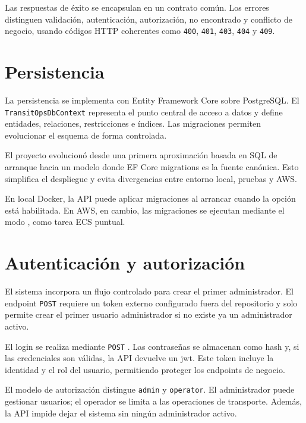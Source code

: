 Las respuestas de éxito se encapsulan en un contrato común. Los errores distinguen validación, autenticación, autorización, no encontrado y conflicto de negocio, usando códigos HTTP coherentes como \texttt{400}, \texttt{401}, \texttt{403}, \texttt{404} y \texttt{409}.

\section{Persistencia}
\label{sec:persistencia}

La persistencia se implementa con Entity Framework Core sobre PostgreSQL. El \texttt{TransitOpsDbContext} representa el punto central de acceso a datos y define entidades, relaciones, restricciones e índices. Las migraciones permiten evolucionar el esquema de forma controlada.

El proyecto evolucionó desde una primera aproximación basada en SQL de arranque hacia un modelo donde EF Core migrations es la fuente canónica. Esto simplifica el despliegue y evita divergencias entre entorno local, pruebas y AWS.

En local Docker, la API puede aplicar migraciones al arrancar cuando la opción  está habilitada. En AWS, en cambio, las migraciones se ejecutan mediante el modo , como tarea ECS puntual.

\section{Autenticación y autorización}
\label{sec:autenticacion-autorizacion}

El sistema incorpora un flujo controlado para crear el primer administrador. El endpoint \texttt{POST}  requiere un token externo configurado fuera del repositorio y solo permite crear el primer usuario administrador si no existe ya un administrador activo.

El login se realiza mediante \texttt{POST} . Las contraseñas se almacenan como hash y, si las credenciales son válidas, la API devuelve un \acrshort{jwt}. Este token incluye la identidad y el rol del usuario, permitiendo proteger los endpoints de negocio.

El modelo de autorización distingue \texttt{admin} y \texttt{operator}. El administrador puede gestionar usuarios; el operador se limita a las operaciones de transporte. Además, la API impide dejar el sistema sin ningún administrador activo.

